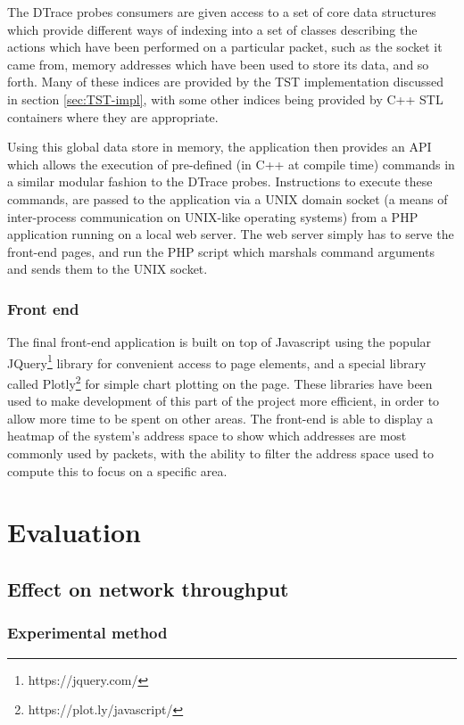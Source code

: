 \documentclass[a4paper,12pt,twoside,openright]{report}
\begin{document}
	The DTrace probes consumers are given access to a set of core data structures which provide different ways of indexing into a set of classes describing the actions which have been performed on a particular packet, such as the socket it came from, memory addresses which have been used to store its data, and so forth. Many of these indices are provided by the TST implementation discussed in section \ref{sec:TST-impl}, with some other indices being provided by C++ STL containers where they are appropriate.
	
	Using this global data store in memory, the application then provides an API which allows the execution of pre-defined (in C++ at compile time) commands in a similar modular fashion to the DTrace probes. Instructions to execute these commands, are passed to the application via a UNIX domain socket (a means of inter-process communication on UNIX-like operating systems) from a PHP application running on a local web server. The web server simply has to serve the front-end pages, and run the PHP script which marshals command arguments and sends them to the UNIX socket.
	
	\subsection{Front end}
	
	The final front-end application is built on top of Javascript using the popular JQuery\footnote{https://jquery.com/} library for convenient access to page elements, and a special library called Plotly\footnote{https://plot.ly/javascript/} for simple chart plotting on the page. These libraries have been used to make development of this part of the project more efficient, in order to allow more time to be spent on other areas. The front-end is able to display a heatmap of the system's address space to show which addresses are most commonly used by packets, with the ability to filter the address space used to compute this to focus on a specific area.
	
	
	\chapter{Evaluation}
	
	\section{Effect on network throughput}
	
	\subsection{Experimental method}
	
\end{document}
